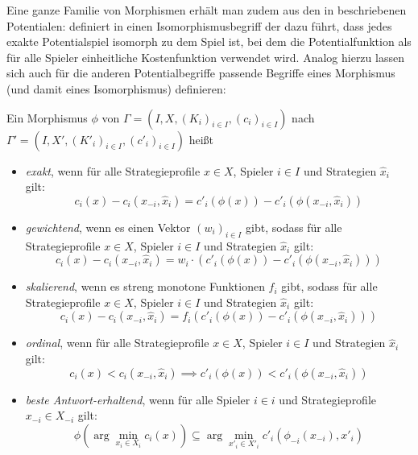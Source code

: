 Eine ganze Familie von Morphismen erhält man zudem aus den in  beschriebenen Potentialen: \citeauthor{ReprOfFiniteGamesAsNCG} definiert in \cite{ReprOfFiniteGamesAsNCG} einen Isomorphismusbegriff der dazu führt, dass jedes exakte Potentialspiel isomorph zu dem Spiel ist, bei dem die Potentialfunktion als für alle Spieler einheitliche Kostenfunktion verwendet wird. Analog hierzu lassen sich auch für die anderen Potentialbegriffe passende Begriffe eines Morphismus (und damit eines Isomorphismus) definieren:

\begin{defn}\label{def:PotentialMorphismen}
	Ein Morphismus $\phi$ von $\Gamma = (I, X, (K_i)_{i\in I}, (c_i)_{i\in I})$ nach $\Gamma' = (I, X', (K'_i)_{i\in I}, (c'_i)_{i\in I})$ heißt
	\begin{itemize}
		\item \emph{exakt}, wenn für alle Strategieprofile $x \in X$, Spieler $i \in I$ und Strategien $\hat{x}_i$ gilt:
			\[c_i(x) - c_i(x_{-i}, \hat{x}_i) = c'_i(\phi(x)) - c'_i(\phi(x_{-i}, \hat{x}_i))\]
		\item \emph{gewichtend}, wenn es einen Vektor $(w_i)_{i \in I}$ gibt, sodass für alle Strategieprofile $x \in X$, Spieler $i \in I$ und Strategien $\hat{x}_i$ gilt:
			\[c_i(x) - c_i(x_{-i}, \hat{x}_i) = w_i\cdot\left(c'_i(\phi(x)) - c'_i(\phi(x_{-i}, \hat{x}_i))\right)\]
		\item \emph{skalierend}, wenn es streng monotone Funktionen $f_i$ gibt, sodass für alle Strategieprofile $x \in X$, Spieler $i \in I$ und Strategien $\hat{x}_i$ gilt:
			\[c_i(x) - c_i(x_{-i}, \hat{x}_i) = f_i(c'_i(\phi(x)) - c'_i(\phi(x_{-i}, \hat{x}_i)))\]
		\item \emph{ordinal}, wenn für alle Strategieprofile $x \in X$, Spieler $i \in I$ und Strategien $\hat{x}_i$ gilt:
			\[c_i(x) < c_i(x_{-i}, \hat{x}_i) \implies c'_i(\phi(x)) < c'_i(\phi(x_{-i}, \hat{x}_i))\]
		\item \emph{beste Antwort-erhaltend}, wenn für alle Spieler $i \in i$ und Strategieprofile $x_{-i} \in X_{-i}$ gilt:
			\[\phi(\arg \min_{x_i \in X_i}c_i(x)) \subseteq \arg \min_{x'_i \in X'_i} c'_i(\phi_{-i}(x_{-i}), x'_i)\]
	\end{itemize}	
\end{defn}



